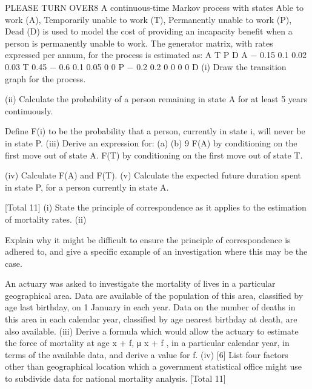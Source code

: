 \documentclass[a4paper,12pt]{article}
\begin{document}
\begin{enumerate}
PLEASE TURN OVER8
A continuous-time Markov process with states {Able to work (A), Temporarily unable
to work (T), Permanently unable to work (P), Dead (D)} is used to model the cost of
providing an incapacity benefit when a person is permanently unable to work. The
generator matrix, with rates expressed per annum, for the process is estimated as:
A
T
P
D
A − 0.15 0.1 0.02 0.03
T 0.45 − 0.6 0.1 0.05
0
0
P
− 0.2 0.2
0
0
0
0
D
(i) Draw the transition graph for the process.

(ii) Calculate the probability of a person remaining in state A for at least 5 years
continuously.

Define F(i) to be the probability that a person, currently in state i, will never be in
state P.
(iii)
Derive an expression for:
(a)
(b)
9
F(A) by conditioning on the first move out of state A.
F(T) by conditioning on the first move out of state T.

(iv) Calculate F(A) and F(T).
(v) Calculate the expected future duration spent in state P, for a person currently
in state A.

[Total 11]
(i) State the principle of correspondence as it applies to the estimation of
mortality rates.
(ii)


Explain why it might be difficult to ensure the principle of correspondence is
adhered to, and give a specific example of an investigation where this may be
the case.

An actuary was asked to investigate the mortality of lives in a particular geographical
area. Data are available of the population of this area, classified by age last birthday,
on 1 January in each year. Data on the number of deaths in this area in each calendar
year, classified by age nearest birthday at death, are also available.
(iii)
Derive a formula which would allow the actuary to estimate the force of
mortality at age x + f, μ x + f , in a particular calendar year, in terms of the
available data, and derive a value for f.
(iv)
[6]
List four factors other than geographical location which a government
statistical office might use to subdivide data for national mortality analysis. 
[Total 11]



\end{enumerate}
\end{document}
